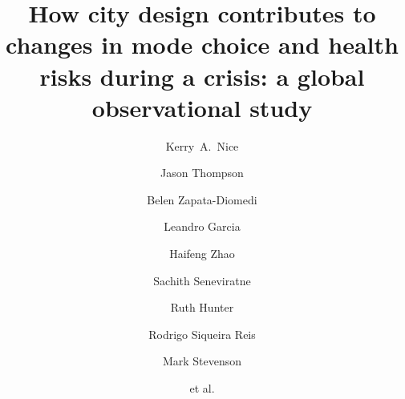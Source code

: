 \documentclass[preprint,12pt]{elsarticle}
\begin{document}
\begin{frontmatter}



\title{How city design contributes to changes in mode choice and health risks during a crisis: a global observational study}


\author[melb]{Kerry~A.~Nice}
\author[melb]{Jason Thompson}
\author[melb]{Belen Zapata-Diomedi}
\author[melb]{Leandro Garcia}
\author[melb]{Haifeng Zhao}
\author[melb]{Sachith Seneviratne}
\author[melb]{Ruth Hunter}
\author[melb]{Rodrigo Siqueira Reis}
\author[melb]{Mark Stevenson}
\author[melb]{et al.}

\address[melb]{Transport, Health, and Urban Design Research Lab, Faculty of Architecture, Building, and Planning, University of Melbourne, VIC, Australia.}



\end{frontmatter}
\end{document}
